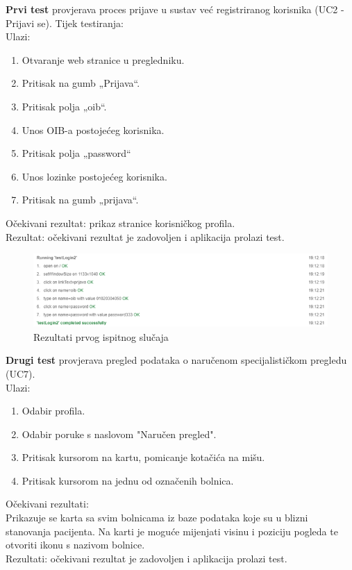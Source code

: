 			\noindent \textbf{Prvi test} provjerava proces prijave u sustav već registriranog korisnika (UC2 - Prijavi se). Tijek testiranja:\\
			Ulazi: 
			\begin{enumerate}
				\item Otvaranje web stranice u pregledniku.
				\item Pritisak na gumb „Prijava“.
				\item Pritisak polja „oib“.
				\item Unos OIB-a postojećeg korisnika.
				\item Pritisak polja „password“
				\item Unos lozinke postojećeg korisnika.
				\item Pritisak na gumb „prijava“.
			\end{enumerate}
			
			\noindent Očekivani rezultat: prikaz stranice korisničkog profila.\\
			Rezultat: očekivani rezultat je zadovoljen i aplikacija prolazi test.
			
			\begin{figure}[H]
				\includegraphics[width=\textwidth]{slike/prijavaUSustav.PNG} %
				\caption{Rezultati prvog ispitnog slučaja}
				\label{fig:prijavaTest} %
			\end{figure}
			\eject 
		
		\noindent \textbf{Drugi test} provjerava pregled podataka o naručenom specijalističkom pregledu (UC7). \\
			Ulazi: 
		\begin{enumerate}
			\item Odabir profila.
			\item Odabir poruke s naslovom "Naručen pregled".
			\item Pritisak kursorom na kartu, pomicanje kotačića na mišu.
			\item Pritisak kursorom na jednu od označenih bolnica.
		\end{enumerate}
		
		\noindent Očekivani rezultati:\\ Prikazuje se karta sa svim bolnicama iz baze podataka koje su u blizni stanovanja pacijenta. Na karti je moguće mijenjati visinu i poziciju pogleda te otvoriti ikonu s nazivom bolnice.\\
		Rezultati: očekivani rezultat je zadovoljen i aplikacija prolazi test.
		

